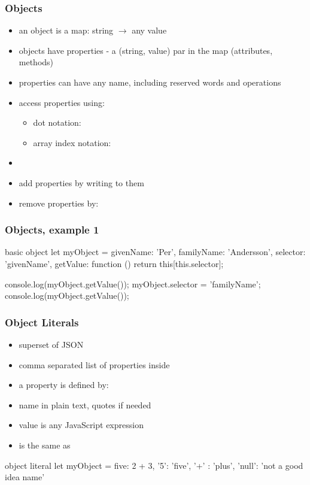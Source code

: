 \begin{frame}[fragile] \frametitle{Objects}
\begin{itemize}
  \item an object is a map: string $\rightarrow$ any value
  \item objects have properties - a (string, value) par in the map (attributes, methods)
  \item properties can have any name, including reserved words and operations
  \item access properties using:
  \begin{itemize}
    \item dot notation: 
    \item array index notation: 
  \end{itemize}
  \item {}
  \item add properties by writing to them 
  \item remove properties by: 
\end{itemize}
\end{frame}

\begin{frame}[fragile] \frametitle{Objects, example 1}
 \begin{CodeBox}{basic object}
let myObject = {
  givenName: 'Per',
  familyName: 'Andersson',
  selector: 'givenName',
  getValue: function () {
    return this[this.selector];
  }
}
 
console.log(myObject.getValue());
myObject.selector = 'familyName';
console.log(myObject.getValue());
 \end{CodeBox}
\end{frame}

\begin{frame}[fragile] \frametitle{Object Literals}
\begin{itemize}
  \item superset of JSON
  \item comma separated list of properties inside \code{\{ \}}
  \item a property is defined by: 
  \item name in plain text, quotes if needed 
  \item value is any JavaScript expression
  \item {} is the same as 
\end{itemize}
\begin{CodeBox}{object literal}
let myObject = {
  five: 2 + 3,
  '5': 'five',
  '+' : 'plus',
  'null': 'not a good idea name'
 }
\end{CodeBox}
\end{frame}

